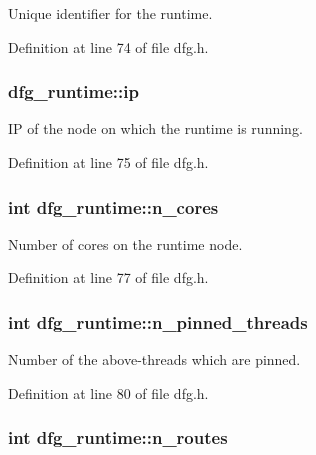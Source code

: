 Unique identifier for the runtime. 



Definition at line 74 of file dfg.\-h.

\hypertarget{structdfg__runtime_ad0f9d4865c5f177d2062ade3ddf407b4}{
\subsubsection[{ip}]{ dfg\-\_\-runtime\-::ip}}\label{structdfg__runtime_ad0f9d4865c5f177d2062ade3ddf407b4}


I\-P of the node on which the runtime is running. 



Definition at line 75 of file dfg.\-h.

\hypertarget{structdfg__runtime_a70d2e7498c96220b9483710588bdd07c}{
\subsubsection[{n\-\_\-cores}]{\setlength{\rightskip}{0pt plus 5cm}int dfg\-\_\-runtime\-::n\-\_\-cores}}\label{structdfg__runtime_a70d2e7498c96220b9483710588bdd07c}


Number of cores on the runtime node. 



Definition at line 77 of file dfg.\-h.

\hypertarget{structdfg__runtime_acb3779eccb9614f48771aeb3e16394bc}{
\subsubsection[{n\-\_\-pinned\-\_\-threads}]{\setlength{\rightskip}{0pt plus 5cm}int dfg\-\_\-runtime\-::n\-\_\-pinned\-\_\-threads}}\label{structdfg__runtime_acb3779eccb9614f48771aeb3e16394bc}


Number of the above-\/threads which are pinned. 



Definition at line 80 of file dfg.\-h.

\hypertarget{structdfg__runtime_a410c8ded04d9b53061dbb939446ac26a}{
\subsubsection[{n\-\_\-routes}]{\setlength{\rightskip}{0pt plus 5cm}int dfg\-\_\-runtime\-::n\-\_\-routes}}\label{structdfg__runtime_a410c8ded04d9b53061dbb939446ac26a}



